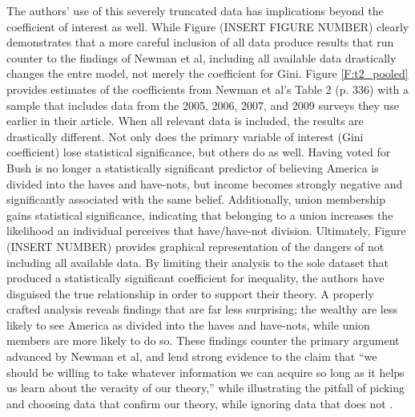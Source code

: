 The authors’ use of this severely truncated data has implications beyond the coefficient of interest as well. While Figure (INSERT FIGURE NUMBER) clearly demonstrates that a more careful inclusion of all data produce results that run counter to the findings of Newman et al, including all available data drastically changes the entre model, not merely the coefficient for Gini. Figure \ref{F:t2_pooled} provides estimates of the coefficients from Newman et al’s Table 2 (p. 336) with a sample that includes data from the 2005, 2006, 2007, and 2009 surveys they use earlier in their article. When all relevant data is included, the results are drastically different. Not only does the primary variable of interest (Gini coefficient) lose statistical significance, but others do as well. Having voted for Bush is no longer a statistically significant predictor of believing America is divided into the haves and have-nots, but income becomes strongly negative and significantly associated with the same belief. Additionally, union membership gains statistical significance, indicating that belonging to a union increases the likelihood an individual perceives that have/have-not division. Ultimately, Figure (INSERT NUMBER) provides graphical representation of the dangers of not including all available data. By limiting their analysis to the sole dataset that produced a statistically significant coefficient for inequality, the authors have disguised the true relationship in order to support their theory. A properly crafted analysis reveals findings that are far less surprising; the wealthy are less likely to see America as divided into the haves and have-nots, while union members are more likely to do so. These findings counter the primary argument advanced by Newman et al, and lend strong evidence to the claim that “we should be willing to take whatever information we can acquire so long as it helps us learn about the veracity of our theory,” while illustrating the pitfall of picking and choosing data that confirm our theory, while ignoring data that does not \citep{King1994 p.31}.


